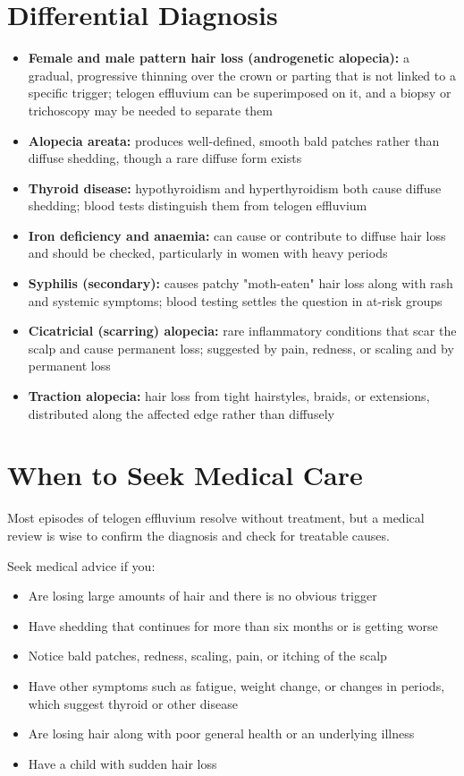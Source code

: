 \section*{Differential Diagnosis}
\begin{itemize}
    \item \textbf{Female and male pattern hair loss (androgenetic alopecia):} a gradual, progressive thinning over the crown or parting that is not linked to a specific trigger; telogen effluvium can be superimposed on it, and a biopsy or trichoscopy may be needed to separate them
    \item \textbf{Alopecia areata:} produces well-defined, smooth bald patches rather than diffuse shedding, though a rare diffuse form exists
    \item \textbf{Thyroid disease:} hypothyroidism and hyperthyroidism both cause diffuse shedding; blood tests distinguish them from telogen effluvium
    \item \textbf{Iron deficiency and anaemia:} can cause or contribute to diffuse hair loss and should be checked, particularly in women with heavy periods
    \item \textbf{Syphilis (secondary):} causes patchy "moth-eaten" hair loss along with rash and systemic symptoms; blood testing settles the question in at-risk groups
    \item \textbf{Cicatricial (scarring) alopecia:} rare inflammatory conditions that scar the scalp and cause permanent loss; suggested by pain, redness, or scaling and by permanent loss
    \item \textbf{Traction alopecia:} hair loss from tight hairstyles, braids, or extensions, distributed along the affected edge rather than diffusely
\end{itemize}

\section*{When to Seek Medical Care}
Most episodes of telogen effluvium resolve without treatment, but a medical review is wise to confirm the diagnosis and check for treatable causes.

Seek medical advice if you:
\begin{itemize}
    \item Are losing large amounts of hair and there is no obvious trigger
    \item Have shedding that continues for more than six months or is getting worse
    \item Notice bald patches, redness, scaling, pain, or itching of the scalp
    \item Have other symptoms such as fatigue, weight change, or changes in periods, which suggest thyroid or other disease
    \item Are losing hair along with poor general health or an underlying illness
    \item Have a child with sudden hair loss
\end{itemize}

